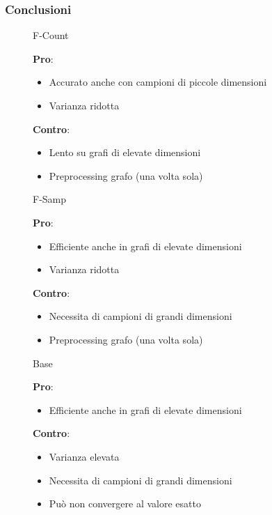 \begin{frame}
	\frametitle{Conclusioni}
	\centering
	\begin{figure}[h]
		\begin{minipage}[t]{.32\textwidth}
			\centering
			\Large
			F-Count
			\medskip

			\small		
			\textbf{Pro}:
			\begin{itemize}
				\item Accurato anche con campioni di piccole dimensioni
				\item Varianza ridotta
			\end{itemize}
		
			\textbf{Contro}:
			\begin{itemize}
				\item Lento su grafi di elevate dimensioni
				\item Preprocessing grafo (una volta sola)
			\end{itemize}
		\end{minipage}\hfill
		\begin{minipage}[t]{.32\textwidth}
			\centering
			\Large
			F-Samp
			\medskip
			
			\small		
			\textbf{Pro}:
			\begin{itemize}
				\item Efficiente anche in grafi di elevate dimensioni
				\item Varianza ridotta
			\end{itemize}
			
			\textbf{Contro}:
			\begin{itemize}
				\item Necessita di campioni di grandi dimensioni
				\item Preprocessing grafo (una volta sola)
			\end{itemize}
		\end{minipage}\hfill
		\begin{minipage}[t]{.32\textwidth}
			\centering
			\Large
			Base
			\medskip
			
			\small		
			\textbf{Pro}:
			\begin{itemize}
				\item Efficiente anche in grafi di elevate dimensioni
			\end{itemize}
			
			\textbf{Contro}:
			\begin{itemize}
				\item Varianza elevata
				\item Necessita di campioni di grandi dimensioni
				\item Può non convergere al valore esatto
			\end{itemize}
		\end{minipage}\hfill
		
	\end{figure}
\end{frame}
